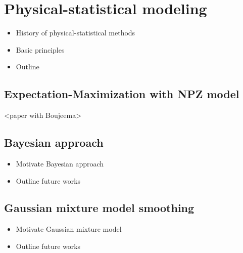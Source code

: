 

\chapter{Physical-statistical modeling}
\label{physstat}

	\begin{itemize}
		\item History of physical-statistical methods
		\item Basic principles
		\item Outline
	\end{itemize}

	\section{Expectation-Maximization with NPZ model}
	\label{physstat:EM}

		<paper with Boujeema>

	\section{Bayesian approach}
	\label{physstat:bayes}

		\begin{itemize}
			\item Motivate Bayesian approach
			\item Outline future works
		\end{itemize}

	\section{Gaussian mixture model smoothing}
	\label{physstat:GM}

		\begin{itemize}
			\item Motivate Gaussian mixture model
			\item Outline future works
		\end{itemize}